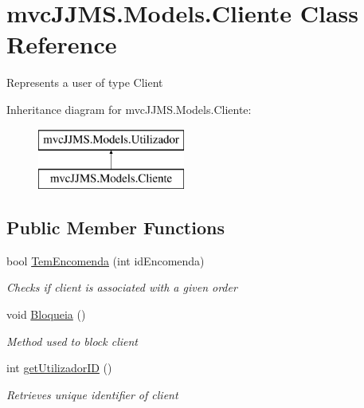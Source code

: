 \hypertarget{classmvc_j_j_m_s_1_1_models_1_1_cliente}{}\section{mvc\+J\+J\+M\+S.\+Models.\+Cliente Class Reference}
\label{classmvc_j_j_m_s_1_1_models_1_1_cliente}


Represents a user of type Client  


Inheritance diagram for mvc\+J\+J\+M\+S.\+Models.\+Cliente\+:\begin{figure}[H]
\begin{center}
\leavevmode
\includegraphics[height=2.000000cm]{classmvc_j_j_m_s_1_1_models_1_1_cliente}
\end{center}
\end{figure}
\subsection*{Public Member Functions}
\begin{DoxyCompactItemize}
\item 
bool \mbox{\hyperlink{classmvc_j_j_m_s_1_1_models_1_1_cliente_a1071410f6080091b9996277cba83f0b4}{Tem\+Encomenda}} (int id\+Encomenda)
\begin{DoxyCompactList}\small\item\em Checks if client is associated with a given order \end{DoxyCompactList}\item 
void \mbox{\hyperlink{classmvc_j_j_m_s_1_1_models_1_1_cliente_ae2c56c8d9c14db342234852e07873147}{Bloqueia}} ()
\begin{DoxyCompactList}\small\item\em Method used to block client \end{DoxyCompactList}\item 
int \mbox{\hyperlink{classmvc_j_j_m_s_1_1_models_1_1_cliente_af711f052377f6684bc93ac4886d20a78}{get\+Utilizador\+ID}} ()
\begin{DoxyCompactList}\small\item\em Retrieves unique identifier of client \end{DoxyCompactList}\end{DoxyCompactItemize}
